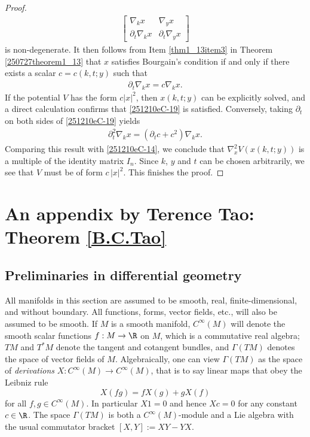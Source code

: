 \documentclass{article}
\numberwithin{equation}{section}
\theoremstyle{plain}
\begin{document}
\begin{proof}
\begin{align}
\begin{bmatrix}
			\nabla_k x & \nabla_y x   \\
			\partial_t\nabla_k x & \partial_t\nabla_y x
		\end{bmatrix}
	\end{align}
	is non-degenerate. It then follows from Item \ref{thm1_13item3} in Theorem \ref{250727theorem1_13} that $x$ satisfies Bourgain's condition if and only if there exists a scalar
	$c=c(k,t;y)$ such that
	\begin{align}\label{251210eC-19}
		\partial_t\nabla_k x = c\nabla_k x.
	\end{align}
    If the potential $V$ has the form $c|x|^2$, then $x(k,t;y)$ can be explicitly solved, and a direct calculation confirms that \eqref{251210eC-19} is satisfied. Conversely, taking $\partial_t$ on both sides of \eqref{251210eC-19} yields
	\begin{align}
		\partial_t^2 \nabla_k x= (\partial_t c+c^2)  \nabla_k x.
	\end{align}
	Comparing this result with \eqref{251210eC-14}, we conclude that $\nabla^2_x V(x(k,t;y))$ is a multiple of the identity matrix $I_n$. Since $k$, $y$ and $t$  can be chosen arbitrarily,  we see that $V$ must be of form $c\, |x|^2$. This finishes the proof.
    
    \end{proof}
	
		
	
	
	
	
	\section{An appendix by Terence Tao: Theorem \ref{B.C.Tao}}\label{Tao's note}



\subsection{Preliminaries in differential geometry}

All manifolds in this section are assumed to be smooth, real, finite-dimensional, and without boundary.  All functions, forms, vector fields, etc., will also be assumed to be smooth.  If $M$ is a smooth manifold, $C^\infty(M)$ will denote the smooth scalar functions $f: M \to \R$ on $M$, which is a commutative real algebra; $TM$ and $T^*M$ denote the tangent and cotangent bundles, and $\Gamma(TM)$ denotes the space of vector fields of $M$.  Algebraically, one can view $\Gamma(TM)$ as the space of \emph{derivations} $X \colon C^\infty(M) \to C^\infty(M)$, that is to say linear maps that obey the Leibniz rule
$$ X(fg) = f X(g) + g X(f)$$
for all $f,g \in C^\infty(M)$.  In particular $X1=0$ and hence $Xc=0$ for any constant $c \in \R$.  The space $\Gamma(TM)$ is both a $C^\infty(M)$-module and a Lie algebra with the usual commutator bracket $[X,Y] := XY - YX$.\\
\end{document}
